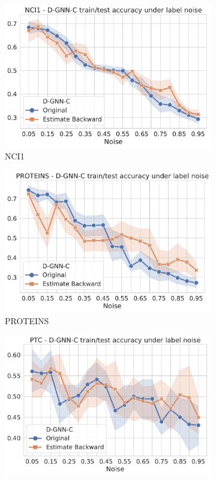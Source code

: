 \documentclass{article} %
\begin{document}
\begin{figure}[h]
\centering
\begin{subfigure}{0.33\textwidth}
  \centering
  \includegraphics[width=\textwidth]{figs/NCI1_est_backward}
  \caption{NCI1}
  \label{f:nci1_est_back}
\end{subfigure}%
\begin{subfigure}{0.33\textwidth}
  \centering
  \includegraphics[width=\textwidth]{figs/PROTEINS_est_backward}
  \caption{PROTEINS}
  \label{f:proteins_est_back}
\end{subfigure}
\begin{subfigure}{0.33\textwidth}
  \centering
  \includegraphics[width=\textwidth]{figs/PTC_est_backward}

\end{subfigure}
\end{figure}
\end{document}
